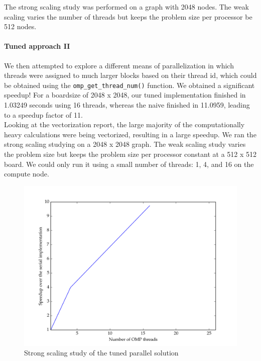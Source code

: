 \documentclass[11pt]{article}
\begin{document}
The strong scaling study was performed on a graph with 2048 nodes. The weak scaling varies the number of threads but keeps the problem size per processor be 512 nodes. \\

\paragraph{Tuned approach II}

We then attempted to explore a different means of parallelization in which threads were assigned to much larger blocks based on their thread id, which could be obtained using the \texttt{omp\_get\_thread\_num()} function. We obtained a significant speedup! For a boardsize of 2048 x 2048, our tuned implementation finished in 1.03249 seconds using 16 threads, whereas the naive finished in 11.0959, leading to a speedup factor of 11. \\

Looking at the vectorization report, the large majority of the computationally heavy calculations were being vectorized, resulting in a large speedup. We ran the strong scaling studying on a 2048 x 2048 graph. The weak scaling study varies the problem size but keeps the problem size per processor constant at a 512 x 512 board. We could only run it using a small number of threads: 1, 4, and 16 on the compute node.

\begin{figure}[H]
\centering
\includegraphics[scale=0.5]{./scaling_studies/strong_scaling_eric.png}
\caption{Strong scaling study of the tuned parallel solution}
\label{fig:ss_eric}
\end{figure}
\end{document}
